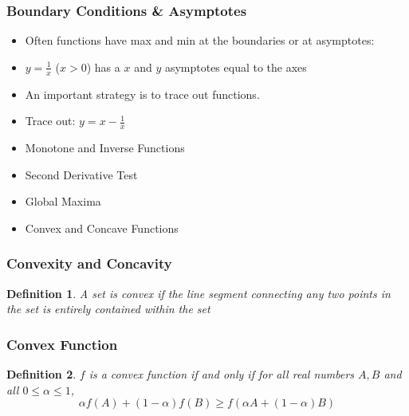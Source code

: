 \documentclass[aspectratio=169, handout]{beamer}
\newtheorem{defn}{Definition}
\numberwithin{equation}{section}
\begin{document}
\begin{frame}
\frametitle{Boundary Conditions \& Asymptotes}

\begin{itemize}
\item Often functions have max and min at the boundaries or at asymptotes:
\item[] $y={\frac{1}{x}}$ ($x>0$) has a $x$ and $y$ asymptotes equal to the axes \pause
\item An important strategy is to trace out functions.
\item[] Trace out: $y=x-{\frac{1}{x}}$ %
\end{itemize}

\end{frame}

\begin{frame}

\begin{itemize}
\item \textcolor{mygray}{Monotone and Inverse Functions}

\item \textcolor{mygray}{Second Derivative Test}
\item \textcolor{mygray}{Global Maxima}
\item \textcolor{myblack}{Convex and Concave Functions}
\end{itemize}

\end{frame}



\begin{frame}
\frametitle{Convexity and Concavity}
 
\begin{defn}
A set is \textit{convex} if the line segment connecting any two points in the set is entirely contained within the set
\end{defn}

\begin{center}
\end{center}

\end{frame}



\begin{frame}
\frametitle{Convex Function}

\begin{defn}
$f$ is a convex function if and only if for all real numbers $A, B$ and all $0\leq \alpha \leq 1$, 
$$\alpha f(A)+(1-\alpha)f(B)\geq f(\alpha A+(1-\alpha)B)$$
\end{defn}

\begin{center}
\end{center}

\end{frame}
\end{document}
